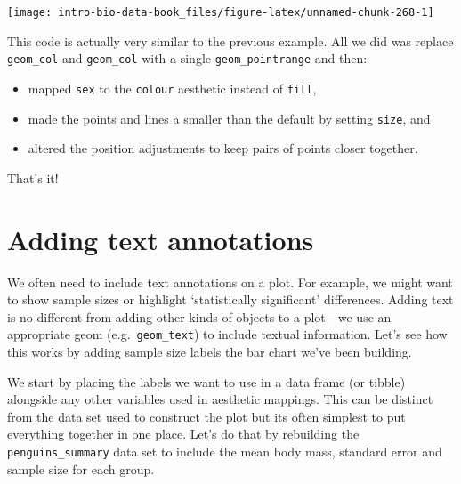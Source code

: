 \documentclass[
]{book}
\providecommand{\tightlist}{%
  \setlength{\itemsep}{0pt}\setlength{\parskip}{0pt}}
\begin{document}
\begin{center}\texttt{[image: intro-bio-data-book\_files/figure-latex/unnamed-chunk-268-1]} \end{center}

This code is actually very similar to the previous example. All we did was replace \texttt{geom\_col} and \texttt{geom\_col} with a single \texttt{geom\_pointrange} and then:

\begin{itemize}
\tightlist
\item
  mapped \texttt{sex} to the \texttt{colour} aesthetic instead of \texttt{fill},
\item
  made the points and lines a smaller than the default by setting \texttt{size}, and
\item
  altered the position adjustments to keep pairs of points closer together.
\end{itemize}

That's it!

\hypertarget{adding-text-annotations}{%
\section{Adding text annotations}\label{adding-text-annotations}}

We often need to include text annotations on a plot. For example, we might want to show sample sizes or highlight `statistically significant' differences. Adding text is no different from adding other kinds of objects to a plot---we use an appropriate geom (e.g.~\texttt{geom\_text}) to include textual information. Let's see how this works by adding sample size labels the bar chart we've been building.

We start by placing the labels we want to use in a data frame (or tibble) alongside any other variables used in aesthetic mappings. This can be distinct from the data set used to construct the plot but its often simplest to put everything together in one place. Let's do that by rebuilding the \texttt{penguins\_summary} data set to include the mean body mass, standard error and sample size for each group.
\end{document}
